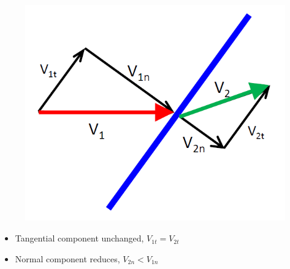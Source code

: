 \begin{figure}[H]
    \centering
    \includegraphics[width=1.0\linewidth]{images/oblique_shocks.png}
\end{figure}
\begin{itemize}
    \item Tangential component unchanged, $V_{1t} = V_{2t}$
    \item Normal component reduces, $V_{2n}<V_{1n}$
\end{itemize}

